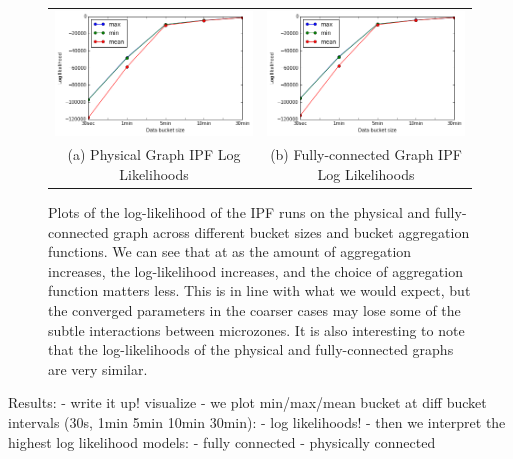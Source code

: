 \begin{figure}
\centering
\begin{tabular}{cc}
\includegraphics[width=.4\linewidth]{figs/physical_loglikelihood} & \includegraphics[width=.4\linewidth]{figs/full_loglikelihood} \\
(a) Physical Graph IPF Log Likelihoods & (b) Fully-connected Graph IPF Log Likelihoods \\[6pt]
\end{tabular}
\caption{Plots of the log-likelihood of the IPF runs on the physical and fully-connected graph across different bucket sizes and bucket aggregation functions. We can see that at as the amount of aggregation increases, the log-likelihood increases, and the choice of aggregation function matters less. This is in line with what we would expect, but the converged parameters in the coarser cases may lose some of the subtle interactions between microzones.
It is also interesting to note that the log-likelihoods of the physical and fully-connected graphs are very similar.}
\label{fig:loglikelihood}
\end{figure}

Results:
- write it up! visualize
- we plot min/max/mean bucket at diff bucket intervals (30s, 1min 5min 10min 30min):
    - log likelihoods!
- then we interpret the highest log likelihood models:
    - fully connected
    - physically connected
\fi
